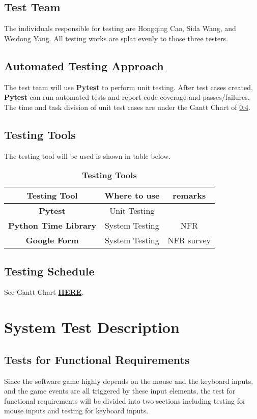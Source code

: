\documentclass[12pt, titlepage]{article}
\begin{document}
\subsection{Test Team}
    The individuals responsible for testing are Hongqing Cao, Sida Wang, and Weidong Yang. All testing works are splat evenly to those three testers.
\subsection{Automated Testing Approach}\label{sec:2.3}
    The test team will use \textbf{Pytest} to perform unit testing. After test cases created, \textbf{Pytest} can run automated tests and report code coverage and passes/failures. The time and task division of unit test cases are under the Gantt Chart of \ref{schedule}.
\subsection{Testing Tools}
    The testing tool will be used is shown in table below.
    \begin{table}[!htb]
    \centering
    \begin{tabular}{|c|c|c|}
        \hline
        Testing Tool & Where to use & remarks \\
        \hline
        \textbf{Pytest} & Unit Testing & \\
        \textbf{Python Time Library} & System Testing & NFR\\
        \textbf{Google Form} & System Testing & NFR survey\\
        \hline
    \end{tabular}
    \caption{\textbf{Testing Tools}}
    \end{table}

\subsection{Testing Schedule}\label{schedule}
    See Gantt Chart \href{https://gitlab.cas.mcmaster.ca/wangs132/minecraft/-/blob/master/ProjectSchedule/ProjectSchedule_3XA3_307.pdf}{\textbf{HERE}}.

\section{System Test Description}

\subsection{Tests for Functional Requirements}
Since the software game highly depends on the mouse and the keyboard inputs, and the game events are all triggered by these input elements, the test for functional requirements will be divided into two sections including testing for mouse inputs and testing for keyboard inputs.
\end{document}

